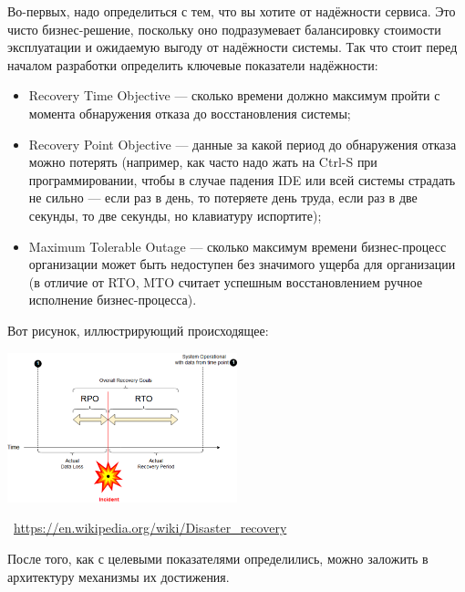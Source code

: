 \documentclass[a5paper]{article}
\newcommand{\attribution}[1] {
    \vspace{-5mm}\begin{flushright}\begin{scriptsize}\textcolor{gray}{\textcopyright\, #1}\end{scriptsize}\end{flushright}
}
\begin{document}
Во-первых, надо определиться с тем, что вы хотите от надёжности сервиса. Это чисто бизнес-решение, поскольку оно подразумевает балансировку стоимости эксплуатации и ожидаемую выгоду от надёжности системы. Так что стоит перед началом разработки определить ключевые показатели надёжности: 
\begin{itemize}
    \item Recovery Time Objective --- сколько времени должно максимум пройти с момента обнаружения отказа до восстановления системы;
    \item Recovery Point Objective --- данные за какой период до обнаружения отказа можно потерять (например, как часто надо жать на Ctrl-S при программировании, чтобы в случае падения IDE или всей системы страдать не сильно --- если раз в день, то потеряете день труда, если раз в две секунды, то две секунды, но клавиатуру испортите);
    \item Maximum Tolerable Outage --- сколько максимум времени бизнес-процесс организации может быть недоступен без значимого ущерба для организации (в отличие от RTO, MTO считает успешным восстановлением ручное исполнение бизнес-процесса).
\end{itemize}

Вот рисунок, иллюстрирующий происходящее:

\begin{center}
    \includegraphics[width=0.5\textwidth]{rpoRtoExample.png}
    \attribution{\url{https://en.wikipedia.org/wiki/Disaster_recovery}}
\end{center}

После того, как с целевыми показателями определились, можно заложить в архитектуру механизмы их достижения.
\end{document}
